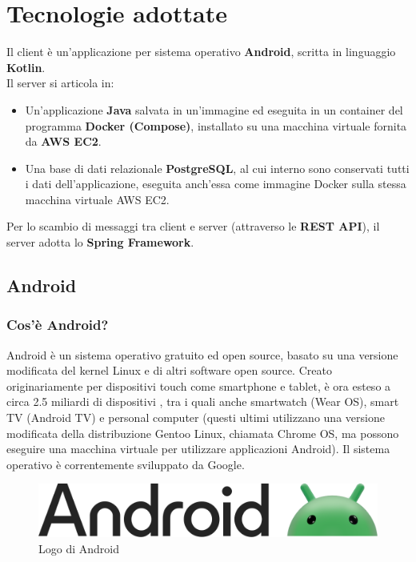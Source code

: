     \section{Tecnologie adottate}
        Il client è un'applicazione per sistema operativo \textbf{Android}, scritta in linguaggio \textbf{Kotlin}. \\
        Il server si articola in:
        \begin{itemize}
            \item Un'applicazione \textbf{Java} salvata in un'immagine ed eseguita in un container del programma \textbf{Docker (Compose)}, installato su una macchina virtuale fornita da \textbf{AWS EC2}.
            \item Una base di dati relazionale \textbf{PostgreSQL}, al cui interno sono conservati tutti i dati dell'applicazione, eseguita anch'essa come immagine Docker sulla stessa macchina virtuale AWS EC2.
        \end{itemize}
        Per lo scambio di messaggi tra client e server (attraverso le \textbf{REST API}), il server adotta lo \textbf{Spring Framework}. \\

        \subsection{Android}
            \subsubsection{Cos'è Android? \cite{Wikipedia1}}
                Android è un sistema operativo gratuito ed open source, basato su una versione modificata del kernel Linux e di altri software open source. Creato originariamente per dispositivi touch come smartphone e tablet, è ora esteso a circa 2.5 miliardi di dispositivi \cite{Google1}, tra i quali anche smartwatch (Wear OS), smart TV (Android TV) e personal computer (questi ultimi utilizzano una versione modificata della distribuzione Gentoo Linux, chiamata Chrome OS, ma possono eseguire una macchina virtuale per utilizzare applicazioni Android). Il sistema operativo è correntemente sviluppato da Google.
            \begin{figure}[htbp!]
                \centering
                \includegraphics[width=0.5\linewidth]{Immagini/System Design/Android.png}
                \caption{Logo di Android}
            \end{figure}
